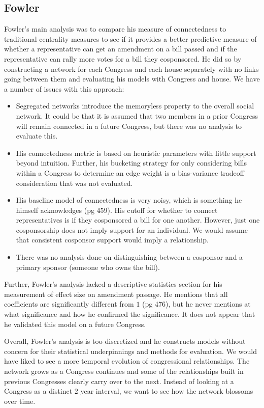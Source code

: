 \subsection{Fowler}

Fowler's main analysis was to compare his measure of connectedness to 
traditional centrality measures to see if it provides a better predictive 
measure of whether a representative can get an amendment on a bill passed and 
if the representative can rally more votes for a bill they cosponsored. He 
did so by constructing a network for each Congress and each house separately 
with no links going between them and evaluating his models with Congress and 
house. We have a number of issues with this approach:

\begin{itemize}
	\item Segregated networks introduce the memoryless property to the overall 
	social network. It could be that it is assumed that two members in a 
	prior Congress will remain connected in a future Congress, but there was no 
	analysis to evaluate this. 
	\item His connectedness metric is based on heuristic parameters with little 
	support beyond intuition. Further, his bucketing strategy for only 
	considering bills within a Congress to determine an edge weight is a 
	bias-variance tradeoff consideration that was not evaluated.
	\item His baseline model of connectedness is very noisy, which is something 
	he himself acknowledges (pg 459). His cutoff for whether to connect 
	representatives is if they cosponsored a bill for one another. However, 
	just one cosponsorship does not imply support for an individual. We would 
	assume that consistent cosponsor support would imply a relationship. 
	\item There was no analysis done on distinguishing between a cosponsor and 
	a primary sponsor (someone who owns the bill).
\end{itemize}

Further, Fowler's analysis lacked a descriptive statistics section for his 
measurement of effect size on amendment passage. He mentions that all 
coefficients are significantly different from $1$ (pg 476), but he never 
mentions at what significance and how he confirmed the significance. It does 
not appear that he validated this model on a future Congress.

Overall, Fowler's analysis is too discretized and he constructs models without 
concern for their statistical underpinnings and methods for evaluation. We 
would have liked to see a more temporal evolution of congressional 
relationships. The network grows as a Congress continues and some of the 
relationships built in previous Congresses clearly carry over to the next. 
Instead of looking at a Congress as a distinct $2$ year interval, we want to 
see how the network blossoms over time.
